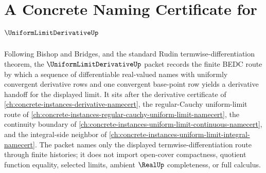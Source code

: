 \chapter{A Concrete Naming Certificate for $\UniformLimitDerivativeUp$}
\label{ch:concrete-instances-uniform-limit-derivative-namecert}

Following Bishop and Bridges, and the standard Rudin termwise-differentiation theorem, the $\UniformLimitDerivativeUp$ packet records the finite BEDC route by which a sequence of differentiable real-valued names with uniformly convergent derivative rows and one convergent base-point row yields a derivative handoff for the displayed limit. It sits after the derivative certificate of \autoref{ch:concrete-instances-derivative-namecert}, the regular-Cauchy uniform-limit route of \autoref{ch:concrete-instances-regular-cauchy-uniform-limit-namecert}, the continuity boundary of \autoref{ch:concrete-instances-uniform-limit-continuous-namecert}, and the integral-side neighbor of \autoref{ch:concrete-instances-uniform-limit-integral-namecert}. The packet names only the displayed termwise-differentiation route through finite histories; it does not import open-cover compactness, quotient function equality, selected limits, ambient $\RealUp$ completeness, or full calculus.

